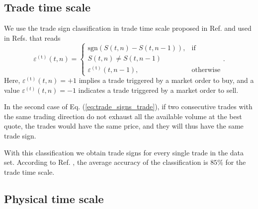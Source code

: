 \subsection{Trade time scale}\label{subsec:trade_time}

We use the trade sign classification in trade time scale proposed in Ref.
\cite{Wang_2016_cross} and used in Refs.
\cite{my_paper_response_financial,Wang_2017,Wang_2018_copulas,Wang_2016_avg}
that reads
\begin{equation}\label{eq:trade_signs_trade}
    \varepsilon^{\left(\textrm{t}\right)}\left(t,n\right)=\left\{
    \begin{array}{cc}
    \text{sgn}\left(S\left(t,n\right)-S\left(t,n-1\right)\right),
    & \text{if }\\ S\left(t,n\right) \ne S\left(t,n-1\right)\\
    \varepsilon^{\left(\textrm{t}\right)}\left(t,n-1\right),
    & \text{otherwise}
    \end{array}\right..
\end{equation}
Here, $\varepsilon^{\left(\textrm{t}\right)}\left( t,n \right) = +1$ implies a
trade triggered by a market order to buy, and a value
$\varepsilon^{\left(t\right)}\left( t,n \right) = -1$ indicates a trade
triggered by a market order to sell.

In the second case of Eq. (\ref{eq:trade_signs_trade}), if two consecutive
trades with the same trading direction do not exhaust all the available volume
at the best quote, the trades would have the same price, and they will thus
have the same trade sign.

With this classification we obtain trade signs for every single trade in the
data set. According to Ref. \cite{Wang_2016_cross}, the average accuracy of the
classification is $85\%$ for the trade time scale.

\subsection{Physical time scale}\label{subsec:physical_time}

